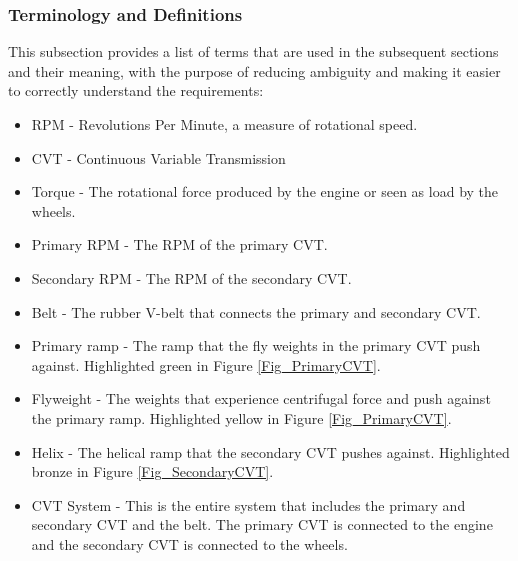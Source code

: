 \documentclass[12pt]{article}
\begin{document}
\subsubsection{Terminology and  Definitions}

This subsection provides a list of terms that are used in the subsequent
sections and their meaning, with the purpose of reducing ambiguity and making it
easier to correctly understand the requirements:

\begin{itemize}
  \item RPM - Revolutions Per Minute, a measure of rotational speed.
  \item CVT - Continuous Variable Transmission
  \item Torque - The rotational force produced by the engine or seen as load by the wheels. 
  \item Primary RPM - The RPM of the primary CVT.
  \item Secondary RPM - The RPM of the secondary CVT.
  \item Belt - The rubber V-belt that connects the primary and secondary CVT.
  \item Primary ramp - The ramp that the fly weights in the primary CVT push against. Highlighted green in Figure \ref{Fig_PrimaryCVT}.
  \item Flyweight - The weights that experience centrifugal force and push against the primary ramp. Highlighted yellow in Figure \ref{Fig_PrimaryCVT}.
  \item Helix - The helical ramp that the secondary CVT pushes against. Highlighted bronze in Figure \ref{Fig_SecondaryCVT}.
  \item CVT System - This is the entire system that includes the primary and secondary CVT and the belt. The primary CVT is connected to the engine and the secondary CVT is connected to the wheels.
\end{itemize}
\end{document}
